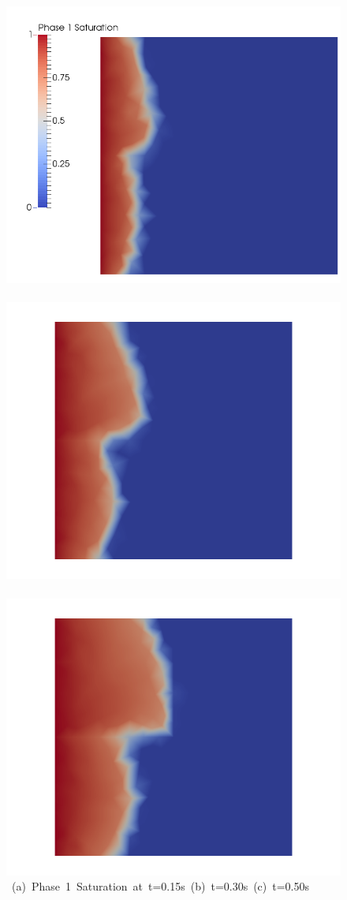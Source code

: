 \begin{landscape}
\begin{figure}[ht] 
\vbox{\vspace{-1cm}
\hbox{\includegraphics[width=.56\textwidth]{./Pics/ArithMeanCase/ArithMeanCase_Saturation_t_dot15.png}
      \includegraphics[width=.56\textwidth]{./Pics/ArithMeanCase/ArithMeanCase_Saturation_t_dot30.png}
      \includegraphics[width=.56\textwidth]{./Pics/ArithMeanCase/ArithMeanCase_Saturation_t_dot50.png}}
\vspace{0.cm}
\hbox{\hspace{0.5cm} (a) Phase 1 Saturation at t=0.15s \hspace{3.75cm} (b) t=0.30s \hspace{5.0cm} (c) t=0.50s}
}
\end{figure}
\end{landscape}
